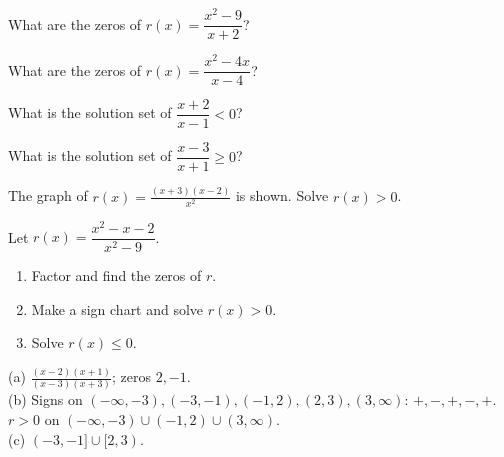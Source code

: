 \begin{exo}{}
What are the zeros of $r(x)=\dfrac{x^2-9}{x+2}$?
\end{exo}
\begin{exo}{}
What are the zeros of $r(x)=\dfrac{x^2-4x}{x-4}$?
\end{exo}
\begin{exo}{}
What is the solution set of $\dfrac{x+2}{x-1}<0$?
\end{exo}
\begin{exo}{}
What is the solution set of $\dfrac{x-3}{x+1}\ge0$?
\choices{$(-\infty,-1]\cup[3,\infty)$}{$[3,\infty)$}{$(-1,3]$}{$(-\infty,-1)\cup[3,\infty)$}
\end{exo}
\begin{exo}{}
The graph of $r(x)=\frac{(x+3)(x-2)}{x^2}$ is shown. Solve $r(x)>0$.
\end{exo}
\begin{exo}{}
Let $r(x)=\dfrac{x^2-x-2}{x^2-9}$.
\begin{enumerate}[label=(\alph*)]
\item Factor and find the zeros of $r$.
\item Make a sign chart and solve $r(x)>0$.
\item Solve $r(x)\le0$.
\end{enumerate}
\begin{solution}
(a) $\frac{(x-2)(x+1)}{(x-3)(x+3)}$; zeros $2,-1$.\\
(b) Signs on $(-\infty,-3),(-3,-1),(-1,2),(2,3),(3,\infty)$: $+,-,+,-,+$. $r>0$ on $(-\infty,-3)\cup(-1,2)\cup(3,\infty)$.\\
(c) $(-3,-1]\cup[2,3)$.
\end{solution}
\end{exo}

